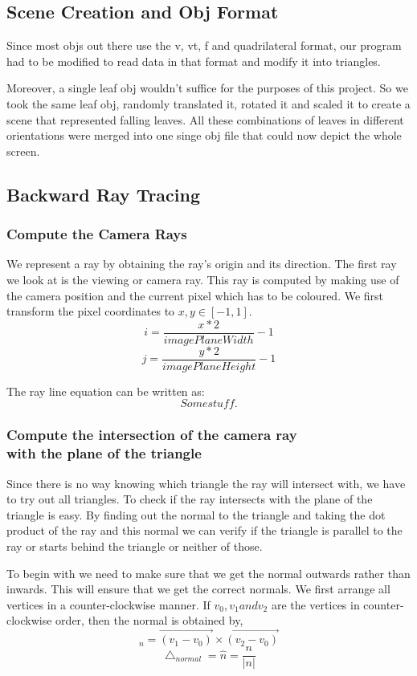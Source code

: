 \documentclass[paper=a4, fontsize=11pt]{scrartcl}
\numberwithin{equation}{section}		%
\numberwithin{figure}{section}			%
\numberwithin{table}{section}				%
\begin{document}
\subsection{Scene Creation and Obj Format}
Since most objs out there use the v, vt, f and quadrilateral format, our program had to be modified to read data in that format and modify it into triangles.
\par
Moreover, a single leaf obj wouldn't suffice for the purposes of this project. So we took the same leaf obj, randomly translated it, rotated it and scaled it to create a scene that represented falling leaves. All these combinations of leaves in different orientations were merged into one singe obj file that could now depict the whole screen.

\subsection{Backward Ray Tracing}

\subsubsection{Compute the Camera Rays}
We represent a ray by obtaining the ray's origin and its direction. The first ray we look at is the viewing or camera ray. This ray is computed by making use of the camera position and the current pixel which has to be coloured. We first transform the pixel coordinates to $x, y \in [-1, 1]$.
\[ i = \dfrac{x * 2}{imagePlaneWidth} - 1 \]
\[ j = \dfrac{y * 2}{imagePlaneHeight} - 1 \]

The ray line equation can be written as:
\[Some stuff.\]

\subsubsection{Compute the intersection of the camera ray\\ with the plane of the triangle}
Since there is no way knowing which triangle the ray will intersect with, we have to try out all triangles.
To check if the ray intersects with the plane of the triangle is easy. By finding out the normal to the triangle and taking the dot product of the ray and this normal we can verify if the triangle is parallel to the ray or starts behind the triangle or neither of those. 
\par
To begin with we need to make sure that we get the normal outwards rather than inwards. This will ensure that we get the correct normals. We first arrange all vertices in a counter-clockwise manner. If $v_{0}, v_{1} and v_{2}$ are the vertices in counter-clockwise order, then the normal is obtained by,
\[_{n} = \overrightarrow{(v_{1}-v_{0})} \times \overrightarrow{(v_{2}-v_{0})}\]
\[\bigtriangleup _{normal} = \hat{n} = \dfrac{n}{\lvert n \rvert}\]
\end{document}
